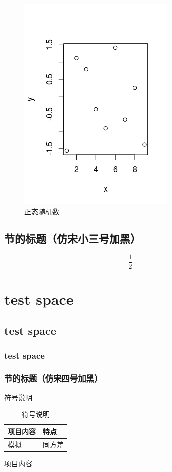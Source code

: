 \begin{figure}[H]
    \centering
    \includegraphics{../assets/sample.png}
    \caption{正态随机数}
\end{figure}

\section{节的标题（仿宋小三号加黑）}
\begin{equation}
\frac{1}{2}
\end{equation}
\chapter{test space}
\section{test space}
\subsection{test space}
\subsection{节的标题（仿宋四号加黑）}
符号说明
{\wuhao
\begin{longtable}{p{5cm}p{5cm}}
\caption{符号说明}\\
\hline
项目内容 & 特点\\
\hline
模拟& 同方差\\
\hline
\end{longtable}
}
项目内容

